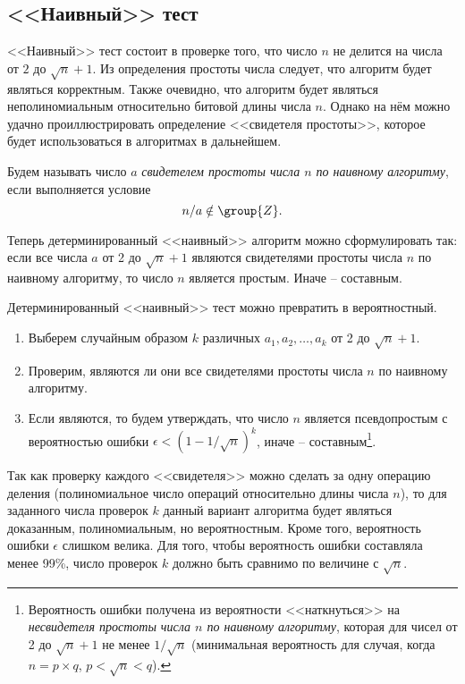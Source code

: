 \subsection{<<Наивный>> тест}\label{section-prime-check-naive}

<<Наивный>> тест состоит в проверке того, что число $n$ не делится на числа от $2$ до $\sqrt{n}+1$. Из определения простоты числа следует, что алгоритм будет являться корректным. Также очевидно, что алгоритм будет являться неполиномиальным относительно битовой длины числа $n$. Однако на нём можно удачно проиллюстрировать определение <<свидетеля простоты>>, которое будет использоваться в алгоритмах в дальнейшем.

Будем называть число $a$ \emph{свидетелем простоты числа $n$ по наивному алгоритму}, если выполняется условие
\[
	n / a \notin \group{Z}.
\]

Теперь детерминированный <<наивный>> алгоритм можно сформулировать так: если все числа $a$ от 2 до $\sqrt{n}+1$ являются свидетелями простоты числа $n$ по наивному алгоритму, то число $n$ является простым. Иначе -- составным.

Детерминированный <<наивный>> тест можно превратить в вероятностный.

\begin{enumerate}
	\item Выберем случайным образом $k$ различных $a_1, a_2, \dots, a_k$ от 2 до $\sqrt{n}+1$.
	\item Проверим, являются ли они все свидетелями простоты числа $n$ по наивному алгоритму. 
	\item Если являются, то будем утверждать, что число $n$ является псевдопростым с вероятностью ошибки $\epsilon < \left( 1 - 1 / \sqrt{n} \right)^k$, иначе -- составным\footnote{Вероятность ошибки получена из вероятности <<наткнуться>> на \emph{несвидетеля простоты числа $n$ по наивному алгоритму}, которая для чисел от 2 до $\sqrt{n}+1$ не менее $1 / \sqrt{n}$ (минимальная вероятность для случая, когда $n = p \times q$, $p < \sqrt{n} < q$).}.
\end{enumerate}

Так как проверку каждого <<свидетеля>> можно сделать за одну операцию деления (полиномиальное число операций относительно длины числа $n$), то для заданного числа проверок $k$ данный вариант алгоритма будет являться доказанным, полиномиальным, но вероятностным. Кроме того, вероятность ошибки $\epsilon$ слишком велика. Для того, чтобы вероятность ошибки составляла менее 99\%, число проверок $k$ должно быть сравнимо по величине с $\sqrt{n}$.
